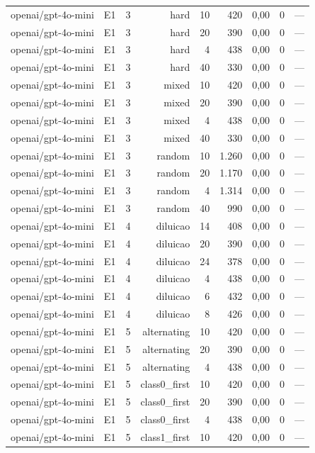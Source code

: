 \begin{table}[htbp]
\begin{tabular}{lllrrrrrr}
openai/gpt-4o-mini & E1 & 3 & hard & 10 & 420 & 0,00 & 0 & — \\
openai/gpt-4o-mini & E1 & 3 & hard & 20 & 390 & 0,00 & 0 & — \\
openai/gpt-4o-mini & E1 & 3 & hard & 4 & 438 & 0,00 & 0 & — \\
openai/gpt-4o-mini & E1 & 3 & hard & 40 & 330 & 0,00 & 0 & — \\
openai/gpt-4o-mini & E1 & 3 & mixed & 10 & 420 & 0,00 & 0 & — \\
openai/gpt-4o-mini & E1 & 3 & mixed & 20 & 390 & 0,00 & 0 & — \\
openai/gpt-4o-mini & E1 & 3 & mixed & 4 & 438 & 0,00 & 0 & — \\
openai/gpt-4o-mini & E1 & 3 & mixed & 40 & 330 & 0,00 & 0 & — \\
openai/gpt-4o-mini & E1 & 3 & random & 10 & 1.260 & 0,00 & 0 & — \\
openai/gpt-4o-mini & E1 & 3 & random & 20 & 1.170 & 0,00 & 0 & — \\
openai/gpt-4o-mini & E1 & 3 & random & 4 & 1.314 & 0,00 & 0 & — \\
openai/gpt-4o-mini & E1 & 3 & random & 40 & 990 & 0,00 & 0 & — \\
openai/gpt-4o-mini & E1 & 4 & diluicao & 14 & 408 & 0,00 & 0 & — \\
openai/gpt-4o-mini & E1 & 4 & diluicao & 20 & 390 & 0,00 & 0 & — \\
openai/gpt-4o-mini & E1 & 4 & diluicao & 24 & 378 & 0,00 & 0 & — \\
openai/gpt-4o-mini & E1 & 4 & diluicao & 4 & 438 & 0,00 & 0 & — \\
openai/gpt-4o-mini & E1 & 4 & diluicao & 6 & 432 & 0,00 & 0 & — \\
openai/gpt-4o-mini & E1 & 4 & diluicao & 8 & 426 & 0,00 & 0 & — \\
openai/gpt-4o-mini & E1 & 5 & alternating & 10 & 420 & 0,00 & 0 & — \\
openai/gpt-4o-mini & E1 & 5 & alternating & 20 & 390 & 0,00 & 0 & — \\
openai/gpt-4o-mini & E1 & 5 & alternating & 4 & 438 & 0,00 & 0 & — \\
openai/gpt-4o-mini & E1 & 5 & class0\_first & 10 & 420 & 0,00 & 0 & — \\
openai/gpt-4o-mini & E1 & 5 & class0\_first & 20 & 390 & 0,00 & 0 & — \\
openai/gpt-4o-mini & E1 & 5 & class0\_first & 4 & 438 & 0,00 & 0 & — \\
openai/gpt-4o-mini & E1 & 5 & class1\_first & 10 & 420 & 0,00 & 0 & — \\

\end{tabular}
\end{table}
